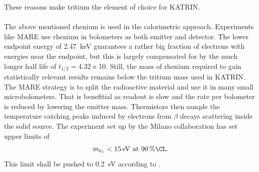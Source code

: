     These reasons make tritium the element of choice for KATRIN.\\\\
    The above mentioned rhenium is used in the calorimetric approach. Experiments like MARE \cite{MARE2007} use rhenium in bolometers as both emitter and detector. The lower endpoint energy of \SI{2.47}{\kilo\electronvolt} guarantees a rather big fraction of electrons with energies near the endpoint, but this is largely compensated for by the much longer half life of $t_{1/2} = $\SI{4.32 e 10}{\year}. Still, the mass of rhenium required to gain statistically relevant results remains below the tritium mass used in KATRIN. The MARE strategy is to split the radioactive material and use it in many small microbolometers. That is benefitial as readout is slow and the rate per bolometer is reduced by lowering the emitter mass. Thermistors then sample the temperature catching peaks induced by electrons from $\beta$ decays scattering inside the solid source.
    The experiment set up by the Milano collaboration has set upper limits of
    \begin{equation}
    	m_{\bar\nu_e} < \SI{15}{\electronvolt} ~ {\rm at}~ \SI{90}{\percent\CL}.
    \end{equation}
    This limit shall be pushed to \SI{0.2}{\electronvolt} according to \cite{MARE2007}.  

